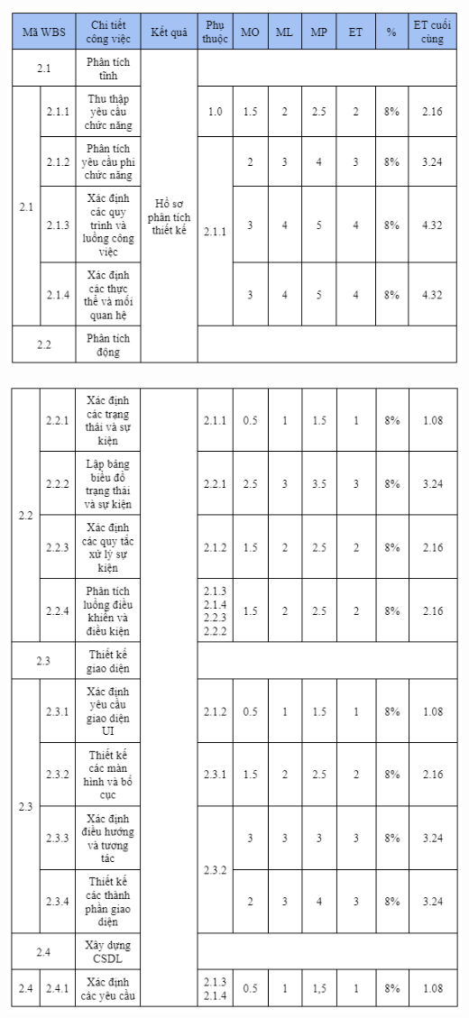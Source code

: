 \documentclass[12pt]{article}
\begin{document}
\includegraphics[width=14.5cm]{ThoiGian2_1.png}
\par
\includegraphics[width=14.5cm]{ThoiGian2_2.png}
\end{document}

